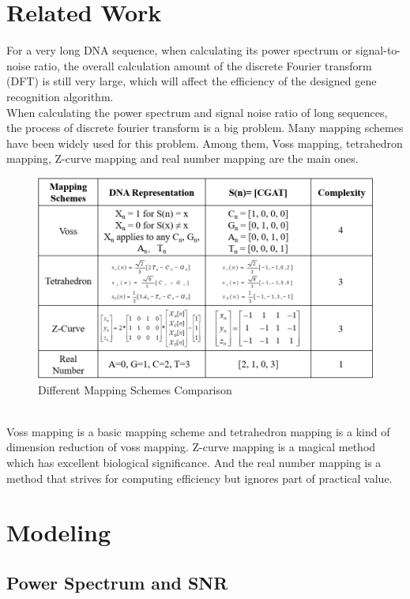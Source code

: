 \documentclass[conference]{IEEEtran}
\begin{document}
\section{Related Work}
For a very long DNA sequence, when calculating its power spectrum or signal-to-noise ratio, the overall calculation amount of the discrete Fourier transform (DFT) is still very large, which will affect the efficiency of the designed gene recognition algorithm.
~\\ \indent When calculating the power spectrum and signal noise ratio of long sequences, the process of discrete fourier transform is a big problem. Many mapping schemes have been widely used for this problem. Among them, Voss mapping, tetrahedron mapping, Z-curve mapping and real number mapping are the main ones.
\begin{figure}[htbp]
    \centering
    \includegraphics[width=\linewidth]{diff_mapping.png}
    \caption{Different Mapping Schemes Comparison}
    \label{fig1}
\end{figure}
~\\ \indent Voss mapping is a basic mapping scheme and tetrahedron mapping is a kind of dimension reduction of voss mapping. Z-curve mapping is a magical method which has excellent biological significance. And the real number mapping is a method that strives for computing efficiency but ignores part of practical value.

\section{Modeling}
\subsection{Power Spectrum and SNR}
\end{document}
